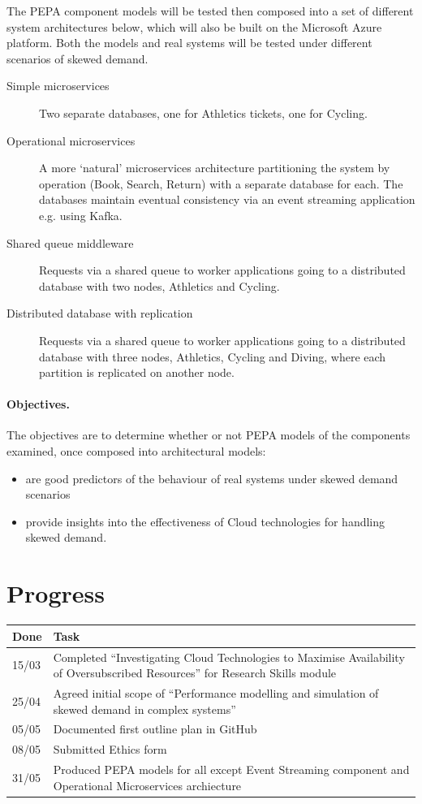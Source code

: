 \documentclass{llncs}
\begin{document}
The PEPA component models will be tested then composed into a set of different system architectures below, which will also be built on the Microsoft Azure platform.  Both the models and real systems will be tested under different scenarios of skewed demand.

\begin{description}
	\item[Simple microservices] Two separate databases, one for Athletics tickets, one for Cycling.
	\item[Operational microservices] A more `natural' microservices architecture partitioning the system by operation (Book, Search, Return) with a separate database for each.  The databases maintain eventual consistency via an event streaming application e.g. using Kafka.
	\item[Shared queue middleware] Requests via a shared queue to worker applications going to a distributed database with two nodes, Athletics and Cycling.
	\item[Distributed database with replication] Requests via a shared queue to worker applications going to a distributed database with three nodes, Athletics, Cycling and Diving, where each partition is replicated on another node.
\end{description}

\paragraph{Objectives.}  The objectives are to determine whether or not PEPA models of the components examined, once composed into architectural models:
\begin{itemize}
	\item are good predictors of the behaviour of real systems under skewed demand scenarios
	\item provide insights into the effectiveness of Cloud technologies for handling skewed demand.
\end{itemize}

%
%

\section{Progress}

\begin{tabular}{ p{} p{} }
	Done & Task \\
	\hline
	15/03 & Completed ``Investigating Cloud Technologies to Maximise Availability of Oversubscribed Resources'' for Research Skills module \\
	25/04 & Agreed initial scope of ``Performance modelling and simulation of skewed demand in complex systems'' \\
	05/05 & Documented first outline plan in GitHub \\
	08/05 & Submitted Ethics form \\
	31/05 & Produced PEPA models for all except Event Streaming component and Operational Microservices archiecture
\end{tabular}
\end{document}
